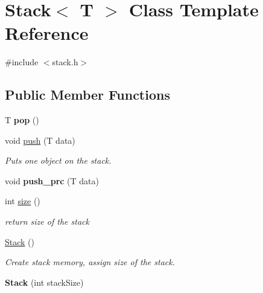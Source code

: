 \hypertarget{class_stack}{}\section{Stack$<$ T $>$ Class Template Reference}
\label{class_stack}


{\ttfamily \#include $<$stack.\+h$>$}

\subsection*{Public Member Functions}
\begin{DoxyCompactItemize}
\item 
\hypertarget{class_stack_aa2ea0e8c3293648589dd734d52487408}{}T {\bfseries pop} ()\label{class_stack_aa2ea0e8c3293648589dd734d52487408}

\item 
void \hyperlink{class_stack_a5a629b74999375d2751ce88eaf24f78e}{push} (T data)
\begin{DoxyCompactList}\small\item\em Puts one object on the stack. \end{DoxyCompactList}\item 
\hypertarget{class_stack_adee3fd0171b575c5ffad38fe543af1e9}{}void {\bfseries push\+\_\+prc} (T data)\label{class_stack_adee3fd0171b575c5ffad38fe543af1e9}

\item 
int \hyperlink{class_stack_a635bef053184eb267c919982390ee18f}{size} ()
\begin{DoxyCompactList}\small\item\em return size of the stack \end{DoxyCompactList}\item 
\hyperlink{class_stack_aefee698059467258bbd79045aca62a63}{Stack} ()
\begin{DoxyCompactList}\small\item\em Create stack memory, assign size of the stack. \end{DoxyCompactList}\item 
\hypertarget{class_stack_adaae7700876392c39fd797d685463b86}{}{\bfseries Stack} (int stack\+Size)\label{class_stack_adaae7700876392c39fd797d685463b86}

\end{DoxyCompactItemize}
